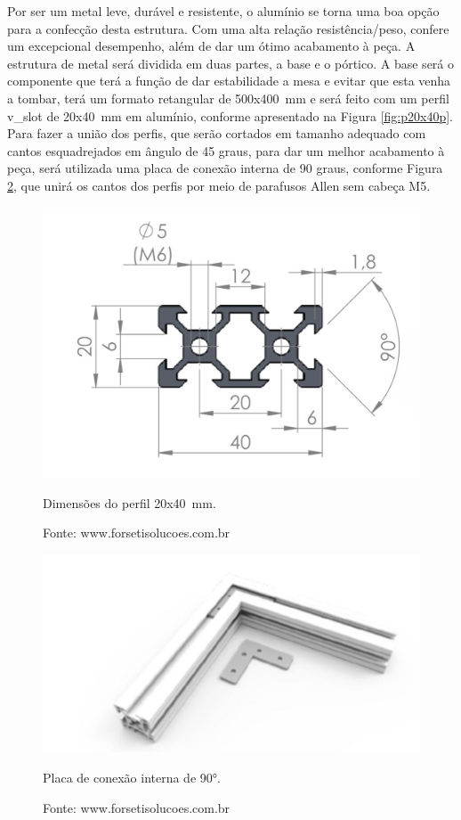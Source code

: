 Por ser um metal leve, durável e resistente, o alumínio se torna uma boa opção para a confecção desta 
estrutura. Com uma alta relação resistência/peso, confere um excepcional desempenho, além de dar um ótimo 
acabamento à peça. A estrutura de metal será dividida em duas partes, a base e o pórtico. A base será 
o componente que terá a função de dar estabilidade a mesa e evitar que esta venha a tombar, terá um 
formato retangular de 500x400~mm e será feito com um perfil v\_slot de 20x40~mm em alumínio, conforme 
apresentado na Figura \ref{fig:p20x40p}. 
Para fazer a união dos perfis, que serão cortados em tamanho adequado com cantos esquadrejados em 
ângulo de 45 graus, para dar um melhor acabamento à peça, será utilizada uma placa de conexão 
interna de 90 graus, conforme Figura \ref{fig:pconexao90p}, que unirá os cantos dos perfis por 
meio de parafusos Allen sem cabeça M5.
    
\begin{figure}[!htb]
\centering
\includegraphics[scale = 0.4]{figuras/p20x40d}
\caption{Dimensões do perfil 20x40~mm.}
\caption*{Fonte: www.forsetisolucoes.com.br}
\label{fig:p20x40d}
\end{figure}
    
\begin{figure}[!htb]
\centering
\includegraphics[scale = 0.4]{figuras/pconexao90p}
\caption{Placa de conexão interna de 90°.}
\caption*{Fonte: www.forsetisolucoes.com.br}
\label{fig:pconexao90p}
\end{figure}
    

